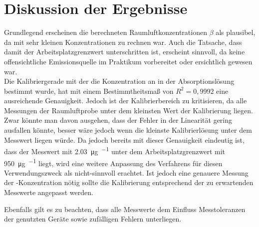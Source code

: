 \newpage
\section{Diskussion der Ergebnisse}
\label{sec:diskussion}
Grundlegend erscheinen die berechneten Raumluftkonzentrationen $\beta$ als plausibel, da mit sehr kleinen Konzentrationen zu rechnen war. Auch die Tatsache, dass damit der Arbeitsplatzgrenzwert unterschritten ist, erscheint sinnvoll, da keine offensichtliche Emissionsquelle im Praktikum vorbereitet oder ersichtlich gewesen war.\\
Die Kalibriergerade mit der die Konzentration an  in der Absorptionslösung bestimmt wurde, hat mit einem Bestimmtheitsmaß von $R^2=0,9992$ eine ausreichende Genauigkeit. Jedoch ist der Kalibrierbereich zu kritisieren, da alle Messungen der Raumluftprobe unter dem kleinsten Wert der Kalibrierung liegen. Zwar könnte man davon ausgehen, dass der Fehler in der Linearität gering ausfallen könnte, besser wäre jedoch wenn die kleinste Kalibrierlösung unter dem Messwert liegen würde. 
Da jedoch bereits mit dieser Genauigkeit eindeutig ist, dass der Messwert mit \SI{2,03}{\micro\gram \per \kmeter} unter dem Arbeitsplatzgrenzwert mit \SI{950}{\micro\gram \per \kmeter} liegt, wird eine weitere Anpassung des Verfahrens für diesen Verwendungszweck als nicht-sinnvoll erachtet. Ist jedoch eine genauere Messung der -Konzentration nötig sollte die Kalibrierung entsprechend der zu erwartenden Messwerte angepasst werden.

Ebenfalls gilt es zu beachten, dass alle Messwerte dem Einfluss Messtoleranzen der genutzten Geräte sowie zufälligen Fehlern unterliegen.
